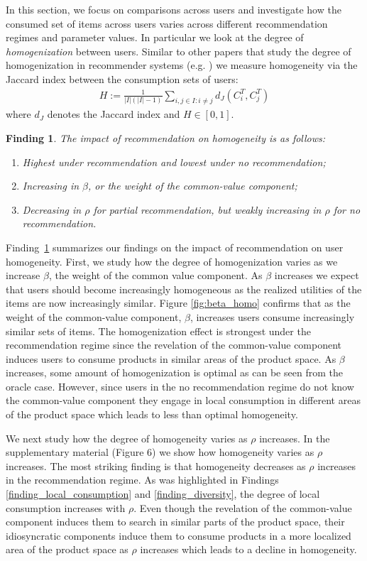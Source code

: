 \documentclass[format=acmsmall, review=false]{acmart}
\newtheorem{finding}{Finding}
\begin{document}
In this section, we focus on comparisons across users and investigate how the consumed set of items across users varies across different recommendation regimes and parameter values. In particular we look at the degree of \textit{homogenization} between users. Similar to other papers that study the degree of homogenization in recommender systems (e.g. \cite{chaney2018algorithmic}) we measure homogeneity via the Jaccard index between the consumption sets of users:
\begin{align*}
H:=\frac{1}{|I|(|I|-1)}\sum_{i,j \in I: i \ne j}d_J(C_i^T,C_j^T)
\end{align*}
where $d_J$ denotes the Jaccard index and $H \in [0,1]$.
\begin{finding}\label{finding_homogeneity}
The impact of recommendation on homogeneity is as follows:
\begin{enumerate}
\item Highest under recommendation and lowest under no recommendation;
\item Increasing in $\beta$, or the weight of the common-value component;
\item Decreasing in $\rho$ for partial recommendation, but weakly increasing in $\rho$ for no recommendation.
\end{enumerate}
\end{finding}
Finding~\ref{finding_homogeneity} summarizes our findings on the impact of recommendation on user homogeneity. First, we study how the degree of homogenization varies as we increase $\beta$, the weight of the common value component. As $\beta$ increases we expect that users should become increasingly homogeneous as the realized utilities of the items are now increasingly similar. Figure \ref{fig:beta_homo} confirms that as the weight of the common-value component, $\beta$, increases users consume increasingly similar sets of items. The homogenization effect is strongest under the recommendation regime since the revelation of the common-value component induces users to consume products in similar areas of the product space. As $\beta$ increases, some amount of homogenization is optimal as can be seen from the oracle case. However, since users in the no recommendation regime do not know the common-value component they engage in local consumption in different areas of the product space which leads to less than optimal homogeneity.
\par
We next study how the degree of homogeneity varies as $\rho$ increases. In the supplementary material (Figure 6) we show how homogeneity varies as $\rho$ increases. The most striking finding is that homogeneity decreases as $\rho$ increases in the recommendation regime. As was highlighted in Findings \ref{finding_local_consumption} and \ref{finding_diversity}, the degree of local consumption increases with $\rho$. Even though the revelation of the common-value component induces them to search in similar parts of the product space, their idiosyncratic components induce them to consume products in a more localized area of the product space as $\rho$ increases which leads to a decline in homogeneity.
\end{document}
